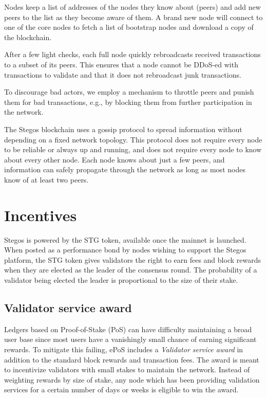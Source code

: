 \documentclass[8pt,fleqn,openany]{book}
\begin{document}
Nodes keep a list of addresses of the nodes they know about (peers) and add new peers to the list as they become aware of them. A brand new node will connect to one of the core nodes to fetch a list of bootstrap nodes and download a copy of the blockchain. 

After a few  light checks, each full node quickly rebroadcasts received transactions to a subset of its peers. This ensures that a node cannot be DDoS-ed with transactions to validate and that it does not rebroadcast junk transactions.

To discourage bad actors, we employ a mechanism to throttle peers and punish them for bad transactions, e.g., by blocking them from further participation in the network.

The Stegos blockchain uses a gossip protocol to spread information without depending on a fixed network topology. This protocol does not require every node to be reliable or always up and running, and does not require every node to know about every other node. Each node knows about just a few peers, and information can safely propagate through the network as long as most nodes know of at least two peers.
	
\section{Incentives}
Stegos is powered by the STG token, available once the mainnet is launched. When posted as a performance bond by nodes wishing to support the Stegos platform, the STG token gives validators the right to earn fees and block rewards when they are elected as the leader of the consensus round. The probability of a validator being elected the leader is proportional to the size of their stake.

\subsection{Validator service award}
Ledgers based on Proof-of-Stake (PoS) can have difficulty maintaining a broad user base since most users have a vanishingly small chance of earning significant rewards. To mitigate this failing, ePoS includes a \textit{Validator service award} in addition to the standard block rewards and transaction fees. The award is meant to incentivize validators with small stakes to maintain the network. Instead of weighting rewards by size of stake, any node which has been providing validation services for a certain number of days or weeks is eligible to win the award.
\end{document}
